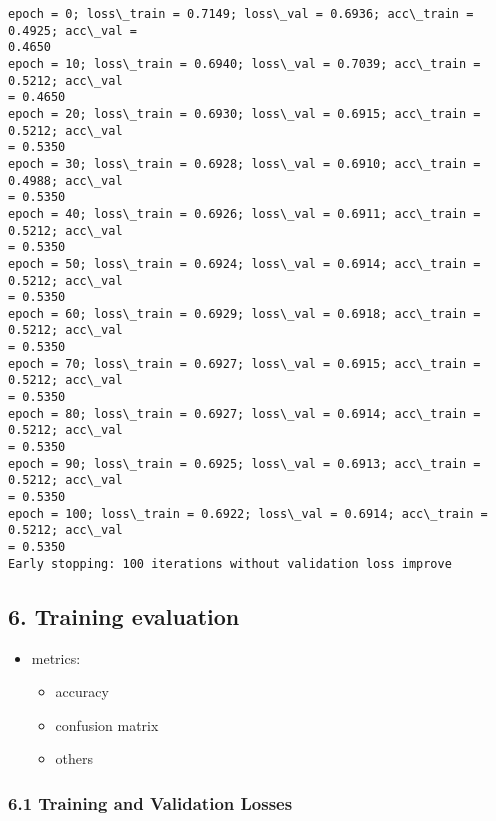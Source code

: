 \documentclass[10pt]{article}
\providecommand{\tightlist}{%
      \setlength{\itemsep}{0pt}\setlength{\parskip}{0pt}}
\begin{document}
    \begin{Verbatim}[commandchars=\\\{\}]
epoch = 0; loss\_train = 0.7149; loss\_val = 0.6936; acc\_train = 0.4925; acc\_val =
0.4650
epoch = 10; loss\_train = 0.6940; loss\_val = 0.7039; acc\_train = 0.5212; acc\_val
= 0.4650
epoch = 20; loss\_train = 0.6930; loss\_val = 0.6915; acc\_train = 0.5212; acc\_val
= 0.5350
epoch = 30; loss\_train = 0.6928; loss\_val = 0.6910; acc\_train = 0.4988; acc\_val
= 0.5350
epoch = 40; loss\_train = 0.6926; loss\_val = 0.6911; acc\_train = 0.5212; acc\_val
= 0.5350
epoch = 50; loss\_train = 0.6924; loss\_val = 0.6914; acc\_train = 0.5212; acc\_val
= 0.5350
epoch = 60; loss\_train = 0.6929; loss\_val = 0.6918; acc\_train = 0.5212; acc\_val
= 0.5350
epoch = 70; loss\_train = 0.6927; loss\_val = 0.6915; acc\_train = 0.5212; acc\_val
= 0.5350
epoch = 80; loss\_train = 0.6927; loss\_val = 0.6914; acc\_train = 0.5212; acc\_val
= 0.5350
epoch = 90; loss\_train = 0.6925; loss\_val = 0.6913; acc\_train = 0.5212; acc\_val
= 0.5350
epoch = 100; loss\_train = 0.6922; loss\_val = 0.6914; acc\_train = 0.5212; acc\_val
= 0.5350
Early stopping: 100 iterations without validation loss improve
    \end{Verbatim}

    \hypertarget{training-evaluation}{%
\subsection{6. Training evaluation}\label{training-evaluation}}

\begin{itemize}
\tightlist
\item
  metrics:

  \begin{itemize}
  \tightlist
  \item
    accuracy
  \item
    confusion matrix
  \item
    others
  \end{itemize}
\end{itemize}

    \hypertarget{training-and-validation-losses}{%
\subsubsection{6.1 Training and Validation
Losses}\label{training-and-validation-losses}}
\end{document}
